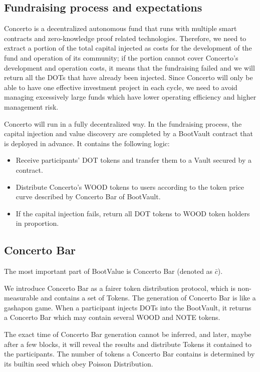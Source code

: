 \documentclass[UTF8]{article}
\begin{document}
\begin{multicols}{2}
\subsection{Fundraising process and expectations}

Concerto is a decentralized autonomous fund that runs with multiple smart contracts and zero-knowledge proof related technologies. Therefore, we need to extract a portion of the total capital injected as costs for the development of the fund and operation of its community; if the portion cannot cover Concerto’s development and operation costs, it means that the fundraising failed and we will return all the DOTs that have already been injected. Since Concerto will only be able to have one effective investment project in each cycle, we need to avoid managing excessively large funds which have lower operating efficiency and higher management risk.

Concerto will run in a fully decentralized way. In the fundraising process, the capital injection and value discovery are completed by a BootVault contract that is deployed in advance. It contains the following logic:

\begin{itemize}
\item  Receive participants’ DOT tokens and transfer them to a Vault secured by a contract.
\item  Distribute Concerto’s WOOD tokens to users according to the token price curve described by Concerto Bar of BootVault.
\item  If the capital injection fails, return all DOT tokens to WOOD token holders in proportion.
\end{itemize}


\subsection{Concerto Bar}

The most important part of BootValue is Concerto Bar (denoted as $\bar{c}$).

We introduce Concerto Bar as a fairer token distribution protocol, which is non-measurable and contains a set of Tokens. The generation of Concerto Bar is like a gashapon game. When a participant injects DOTs into the BootVault, it returns a Concerto Bar which may contain several WOOD and NOTE tokens.

The exact time of Concerto Bar generation cannot be inferred, and later, maybe after a few blocks, it will reveal the results and distribute Tokens it contained to the participants. The number of tokens a Concerto Bar contains is determined by its builtin seed which obey Poisson Distribution.


\end{multicols}
\end{document}
